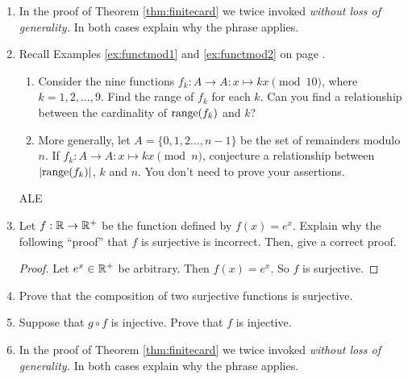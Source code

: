 \begin{exercises}
\begin{enumerate}
  \item In the proof of Theorem \ref{thm:finitecard} we twice invoked \emph{without loss of generality.} In both cases explain why the phrase applies.
  
  \item\label{ex:kfunc} Recall Examples \ref{ex:functmod1} and \ref{ex:functmod2} on page \pageref{ex:functmod1}.
  \begin{enumerate}
    \item Consider the nine functions $f_k:A\to A:x\mapsto kx\pmod{10}$, where $k=1,2,\ldots,9$. Find the range of $f_k$ for each $k$. Can you find a relationship between the cardinality of $\operatorname{range}(f_k)$ and $k$?
		\item More generally, let $A=\{0,1,2\ldots,n-1\}$ be the set of remainders modulo $n$. If $f_k:A\to A:x\mapsto kx\pmod n$, conjecture a relationship between $\left| \operatorname{range}(f_k)\right|$, $k$ and $n$. You don't need to prove your assertions.
  \end{enumerate}
  
  
  ALE
  
    \item Let $f : \mathbb{R} \to \mathbb{R}^+$ be the function defined by $f(x) = e^x$. Explain why the following ``proof'' that $f$ is surjective is incorrect. Then, give a correct proof.  
\begin{proof}
Let $e^x \in \mathbb{R}^+$ be arbitrary. Then $f(x) = e^x$. So $f$ is surjective.
\end{proof}
	
  \item Prove that the composition of two surjective functions is surjective.
  
  \item Suppose that $g\circ f$ is injective. Prove that $f$ is injective.
  
  \item In the proof of Theorem \ref{thm:finitecard} we twice invoked \emph{without loss of generality.} In both cases explain why the phrase applies.
  


\end{enumerate}
\end{exercises}
